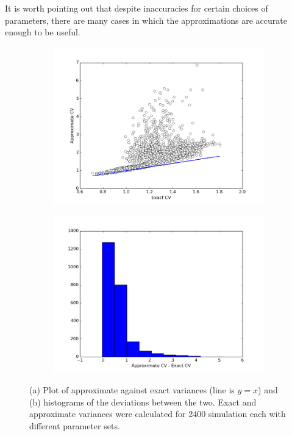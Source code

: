 \documentclass[a4paper,12pt]{article}
\begin{document}
It is worth pointing out that despite inaccuracies for certain choices of parameters, there are many cases in which the approximations are accurate enough to be useful.

\begin{figure}[!ht]
        \centering
        \begin{subfigure}[!ht]{0.7\textwidth}
                \includegraphics[width=\textwidth]{images/approx_exact_var}
                \caption{}
                \label{fig:approx_exact_var}
        \end{subfigure}%
        
        \begin{subfigure}[b]{0.7\textwidth}
                \includegraphics[width=\textwidth]{images/approx_var_dev}
                \caption{}
                \label{fig:approx_var_dev}
        \end{subfigure}
        
\caption{(a) Plot of approximate against exact variances (line is $y=x$) and (b) histograms of the deviations between the two. Exact and approximate variances were calculated for 2400 simulation each with different parameter sets.}
\label{fig:dev_hists}
\end{figure}
\end{document}
